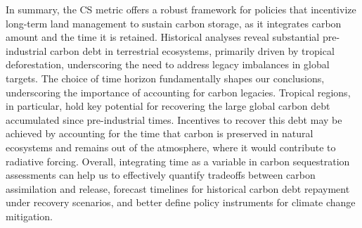 \documentclass[ProofPDF]{./Styles/Jnls-Template-V3}
\begin{document}
In summary, the CS metric offers a robust framework for policies that incentivize long-term land management to sustain carbon storage, as it integrates carbon amount and the time it is retained. Historical analyses reveal substantial pre-industrial carbon debt in terrestrial ecosystems, primarily driven by tropical deforestation, underscoring the need to address legacy imbalances in global targets. The choice of time horizon fundamentally shapes our conclusions, underscoring the importance of accounting for carbon legacies. Tropical regions, in particular, hold key potential for recovering the large global carbon debt accumulated since pre-industrial times. Incentives to recover this debt may be achieved by accounting for the time that carbon is preserved in natural ecosystems and remains out of the atmosphere, where it would contribute to radiative forcing. Overall, integrating time as a variable in carbon sequestration assessments can help us to effectively quantify tradeoffs between carbon assimilation and release, forecast timelines for historical carbon debt repayment under recovery scenarios, and better define policy instruments for climate change mitigation.





\end{document}
